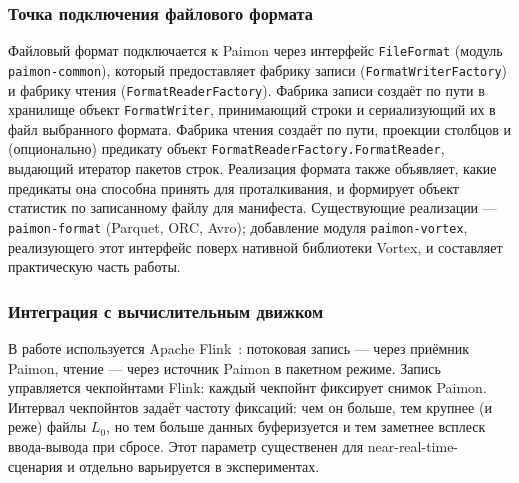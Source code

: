 \subsubsection{Точка подключения файлового формата}

Файловый формат подключается к Paimon через интерфейс \texttt{FileFormat} (модуль
\texttt{paimon-common}), который предоставляет фабрику записи
(\texttt{FormatWriterFactory}) и фабрику чтения (\texttt{FormatReaderFactory}).
Фабрика записи создаёт по пути в хранилище объект \texttt{FormatWriter}, принимающий
строки и сериализующий их в файл выбранного формата. Фабрика чтения создаёт по
пути, проекции столбцов и (опционально) предикату объект
\texttt{FormatReaderFactory.FormatReader}, выдающий итератор пакетов строк.
Реализация формата также объявляет, какие предикаты она способна принять для
проталкивания, и формирует объект статистик по записанному файлу для манифеста.
Существующие реализации --- \texttt{paimon-format} (Parquet, ORC, Avro); добавление
модуля \texttt{paimon-vortex}, реализующего этот интерфейс поверх нативной библиотеки
Vortex, и составляет практическую часть работы.

\subsubsection{Интеграция с вычислительным движком}

В работе используется Apache Flink~\cite{hueske2019flink}: потоковая запись ---
через приёмник Paimon, чтение --- через источник Paimon в пакетном режиме. Запись
управляется чекпойнтами Flink: каждый чекпойнт фиксирует снимок Paimon. Интервал
чекпойнтов задаёт частоту фиксаций: чем он больше, тем крупнее (и реже) файлы
\(L_0\), но тем больше данных буферизуется и тем заметнее всплеск ввода-вывода при
сбросе. Этот параметр существенен для near-real-time-сценария и отдельно варьируется
в экспериментах.
